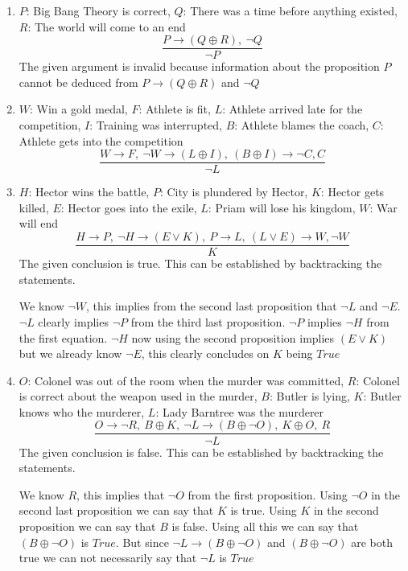 \documentclass[12pt]{article}
\newenvironment{solution}[2][Solution]{ \begin{trivlist}
\item[\hskip \labelsep {\bfseries #1}]}{\end{trivlist}}
\begin{document}
\begin{solution}{1}
\item[]
\begin{enumerate}
  \parskip=0in
  \parsep=0in
  \itemsep=0in
\item $P$: Big Bang Theory is correct, $Q$: There was a time before anything existed, $R$: The world will come to an end
\[
\frac{P\rightarrow(Q \oplus R),\ \neg Q}{\neg P}
\]
The given argument is invalid because information about the proposition $P$ cannot be deduced from $P\rightarrow(Q \oplus R)$ and $\neg Q$
\item $W$: Win a gold medal, $F$: Athlete is fit, $L$: Athlete arrived late for the competition, $I$: Training was interrupted, $B$: Athlete blames the coach, $C$: Athlete gets into the competition
\[
\frac{W \rightarrow F,\ \neg W \rightarrow (L \oplus I),\ (B \oplus I) \rightarrow \neg C, C}{\neg L}
\]
\item $H$: Hector wins the battle, $P$: City is plundered by Hector, $K$: Hector gets killed, $E$: Hector goes into the exile, $L$: Priam will lose his kingdom, $W$: War will end \\
\[
\frac{H \rightarrow P,\ \neg H \rightarrow (E \vee K),\ P \rightarrow L,\ (L \vee E) \rightarrow W, \neg W}{K}
\]
The given conclusion is true. This can be established by backtracking the statements.

We know $\neg W$, this implies from the second last proposition that $\neg L$ and $\neg E$. $\neg L$ clearly implies $\neg P$ from the third last proposition. $\neg P$ implies $\neg H$ from the first equation. $\neg H$ now using the second proposition implies $(E \vee K)$ but we already know $\neg E$, this clearly concludes on $K$ being $True$
\\
\item $O$: Colonel was out of the room when the murder was committed, $R$: Colonel is correct about the weapon used in the murder, $B$: Butler is lying, $K$: Butler knows who the murderer, $L$: Lady Barntree was the murderer
\[
\frac{O \rightarrow \neg R,\ B \oplus K,\ \neg L \rightarrow (B \oplus \neg O),\ K \oplus O,\ R}{\neg L}
\]
The given conclusion is false. This can be established by backtracking the statements.

We know $R$, this implies that $\neg O$ from the first proposition. Using $\neg O$ in the second last proposition we can say that $K$ is true. Using $K$ in the second proposition we can say that $B$ is false. Using all this we can say that $(B \oplus \neg O)$ is $True$. But since $\neg L \rightarrow (B \oplus \neg O)$ and $(B \oplus \neg O)$ are both true we can not necessarily say that $\neg L$ is $True$
\end{enumerate}
\end{solution}
\end{document}
